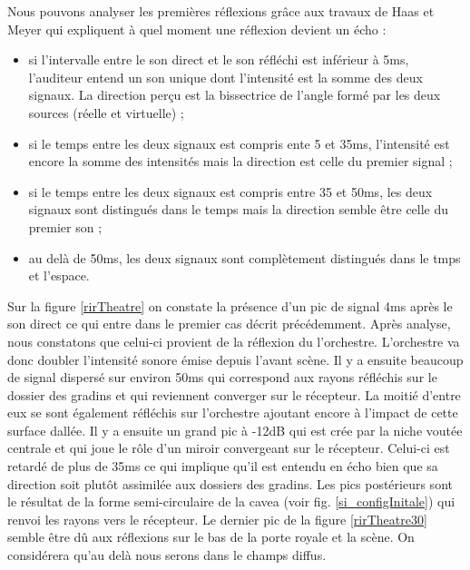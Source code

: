 Nous pouvons analyser les premières réflexions grâce aux travaux de Haas et Meyer \cite[p.49]{haas} qui expliquent à quel moment une réflexion devient un écho :
\begin{itemize}
\item si l'intervalle entre le son direct et le son réfléchi est inférieur à 5ms, l'auditeur entend un son unique dont l'intensité est la somme des deux signaux. La direction perçu est la bissectrice de l'angle formé par les deux sources (réelle et virtuelle) ;
\item si le temps entre les deux signaux est compris ente 5 et 35ms, l'intensité est encore la somme des intensités mais la direction est celle du premier signal ;
\item si le temps entre les deux signaux est compris entre 35 et 50ms, les deux signaux sont distingués dans le temps mais la direction semble être celle du premier son ;
\item au delà de 50ms, les deux signaux sont complètement distingués dans le tmps et l'espace.
\end{itemize}
Sur la figure \ref{rirTheatre} on constate la présence d'un pic de signal 4ms après le son direct ce qui entre dans le premier cas décrit précédemment. Après analyse, nous constatons que celui-ci provient de la réflexion du l'orchestre. L'orchestre va donc doubler l'intensité sonore émise depuis l'avant scène. Il y a ensuite beaucoup de signal dispersé sur environ 50ms qui correspond aux rayons réfléchis sur le dossier des gradins et qui reviennent converger sur le récepteur. La moitié d'entre eux se sont également réfléchis sur l'orchestre ajoutant encore à l'impact de cette surface dallée. Il y a ensuite un grand pic à -12dB qui est crée par la niche voutée centrale et qui joue le rôle d'un miroir convergeant sur le récepteur. Celui-ci est retardé de plus de 35ms ce qui implique qu'il est entendu en écho bien que sa direction soit plutôt assimilée aux dossiers des gradins. Les pics postérieurs sont le résultat de la forme semi-circulaire de la \gls{cavea} (voir fig. \ref{si_configInitale}) qui renvoi les rayons vers le récepteur. Le dernier pic de la figure \ref{rirTheatre30} semble être dû aux réflexions sur le bas de la porte royale et la scène. On considérera qu'au delà nous serons dans le champs diffus. 
%
